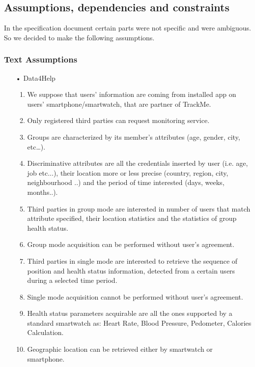 \subsection{Assumptions, dependencies and constraints}
In the specification document certain parts were not specific and were ambiguous. So we decided to make the following assumptions.

\subsubsection{Text Assumptions}
\begin{enumerate}

\item[•] {\Large Data4Help}
	\begin{enumerate}
	\item We suppose that users' information are coming from installed app on users' smartphone/smartwatch, that are partner of TrackMe.
	\item Only registered third parties can request monitoring service.
	\item Groups are characterized by its member’s attributes (age, gender, city, etc…).
	\item Discriminative attributes are all the credentials inserted by user (i.e. age, job etc...), their location more or less precise (country, region, city, neighbourhood ..) and the period of time interested (days, weeks, months..).
	\item Third parties in group mode are interested in number of users that match attribute specified, their location statistics and the statistics of group health status.
	\item Group mode acquisition can be performed without user's agreement.
	\item Third parties in single mode are interested to retrieve the sequence of position and health status information, detected from a certain users during a selected time period.	
	\item Single mode acquisition cannot be performed without user's agreement.
	\item Health status parameters acquirable are all the ones supported by a standard smartwatch as: Heart Rate, Blood Pressure, Pedometer, Calories Calculation.
	\item Geographic location can be retrieved either by smartwatch or smartphone.
	\end{enumerate}
	

\end{enumerate}
